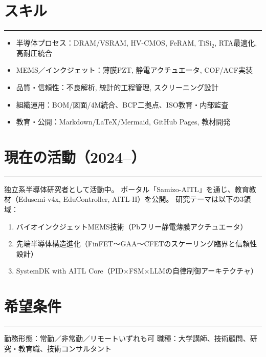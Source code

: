 \documentclass[11pt,ja=standard,engine=luatex]{bxjsarticle} %
\newcommand{\cvsection}[1]{\section*{#1}\vspace{-0.3em}\hrule\vspace{0.5em}}
\begin{document}
\cvsection{スキル}
\begin{itemize}
  \item 半導体プロセス：DRAM/VSRAM, HV-CMOS, FeRAM, TiSi$_2$, RTA最適化, 高耐圧統合
  \item MEMS／インクジェット：薄膜PZT, 静電アクチュエータ, COF/ACF実装
  \item 品質・信頼性：不良解析, 統計的工程管理, スクリーニング設計
  \item 組織運用：BOM/図面/4M統合、BCP二拠点、ISO教育・内部監査
  \item 教育・公開：Markdown/LaTeX/Mermaid, GitHub Pages, 教材開発
\end{itemize}

\cvsection{現在の活動（2024–）}
独立系半導体研究者として活動中。  
ポータル「Samizo-AITL」を通じ、教育教材（Edusemi-v4x, EduController, AITL-H）を公開。  
研究テーマは以下の3領域：
\begin{enumerate}
  \item バイオインクジェットMEMS技術（Pbフリー静電薄膜アクチュエータ）
  \item 先端半導体構造進化（FinFET～GAA～CFETのスケーリング臨界と信頼性設計）
  \item SystemDK with AITL Core（PID×FSM×LLMの自律制御アーキテクチャ）
\end{enumerate}

\cvsection{希望条件}
勤務形態：常勤／非常勤／リモートいずれも可  
職種：大学講師、技術顧問、研究・教育職、技術コンサルタント
\end{document}
